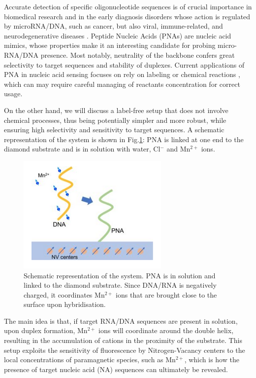 Accurate detection of specific oligonucleotide sequences is of crucial importance in biomedical research and in the early diagnosis disorders whose action is regulated by microRNA/DNA, such as cancer, but also viral, immune-related, and neurodegenerative diseases \parencite{li_micrornas_2012}.
Peptide Nucleic Acids (PNAs) are nucleic acid mimics, whose properties make it an interesting candidate for probing micro-RNA/DNA presence. Most notably, neutrality of the backbone confers great selectivity to target sequences and stability of duplexes.
Current applications of PNA in nucleic acid sensing focuses on  rely on labeling or chemical reactions \parencite{saarbach2019peptide}, which can may require careful managing of reactants concentration for correct usage.

On the other hand, we will discuss a label-free setup that does not involve chemical processes, thus being potentially simpler and more robust, while ensuring high selectivity and sensitivity to target sequences.
A schematic representation of the system is shown in Fig.\ref{schematic_system}: PNA is linked at one end to the diamond substrate and is in solution with water, Cl$^-$ and Mn$^{2+}$ ions.
\begin{figure}[h]
    \centering
    \includegraphics[width=0.5\linewidth]{schematic_system_.png}
    \caption{Schematic representation of the system. PNA is in solution and linked to the diamond substrate. Since DNA/RNA is negatively charged, it coordinates Mn$^{2+}$ ions that are brought close to the surface upon hybridisation. }
    \label{schematic_system}
\end{figure}

The main idea is that, if target RNA/DNA sequences are present in solution, upon duplex formation, Mn$^{2+}$ ions will coordinate around the double helix, resulting in the accumulation of cations in the proximity of the substrate.
This setup exploits the sensitivity of fluorescence by Nitrogen-Vacancy centers to the local concentrations of paramagnetic species, such as Mn$^{2+}$, which is how  the presence of target nucleic acid (NA) sequences can ultimately be revealed.

